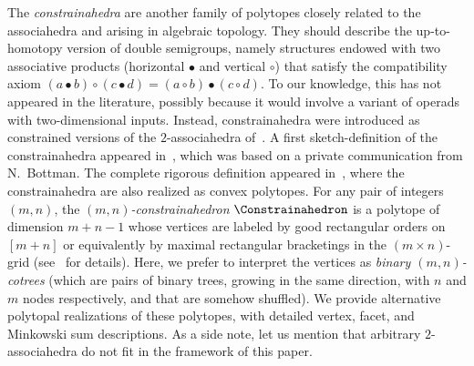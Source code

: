 \documentclass[AHL,Unicode,longabstracts,published]{cedram}
\begin{document}
The
\emph{constrainahedra} are another family of polytopes closely related to the associahedra and arising in algebraic topology. They should describe the up-to-homotopy version of double semigroups, namely structures endowed with two associative products (horizontal $\bullet$ and vertical $\circ$) that satisfy the compatibility axiom $(a \bullet b) \circ (c \bullet d) = (a \circ b) \bullet (c \circ d)$. To our knowledge, this has not appeared in the literature, possibly because it would involve a variant of operads with two-dimensional inputs. Instead, constrainahedra were introduced as constrained versions of the $2$-associahedra of~\cite{Bottman}. A first sketch-definition of the constrainahedra appeared in~\cite{Tierney}, which was based on a private communication from N.~Bottman. The complete rigorous definition appeared in~\cite{BottmanPoliakova,Poliakova}, where the constrainahedra are also realized as convex polytopes. For any pair of integers $(m,n)$, the
\emph{$(m,n)$-constrainahedron} $\Constrainahedron$ is a polytope of dimension $m+n-1$ whose vertices are labeled by good rectangular orders on $[m+n]$ or equivalently by maximal rectangular bracketings in the $(m \times n)$-grid (see~\cite{BottmanPoliakova,Poliakova} for details). Here, we prefer to interpret the vertices as
\emph{binary $(m,n)$-cotrees} (which are pairs of binary trees, growing in the same direction, with $n$ and $m$ nodes respectively, and that are somehow shuffled). We provide alternative polytopal realizations of these polytopes, with detailed vertex, facet, and Minkowski sum descriptions. As a side note, let us mention that arbitrary $2$-associahedra do not fit in the framework of this paper.
\end{document}

